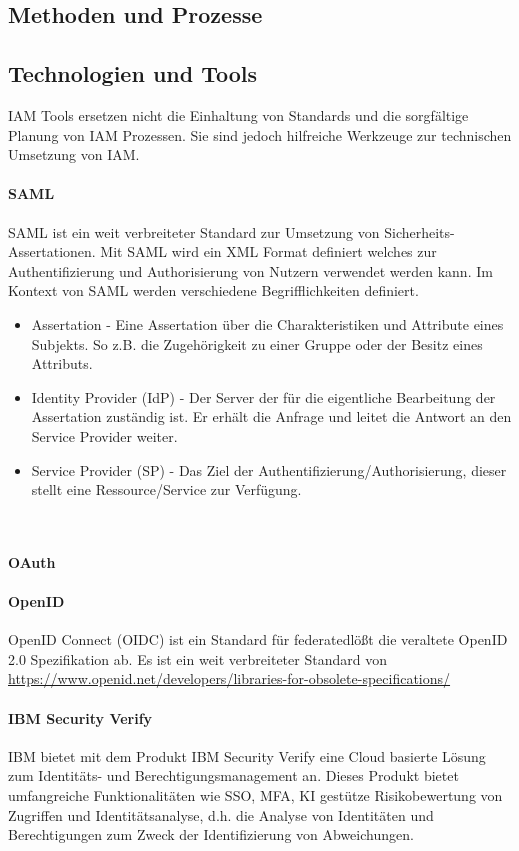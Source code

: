 \documentclass[10pt]{article}
\begin{document}
\subsection{Methoden und Prozesse}
\subsection{Technologien und Tools}
IAM Tools ersetzen nicht die Einhaltung von Standards und die sorgfältige Planung von IAM Prozessen. Sie sind jedoch hilfreiche Werkzeuge zur technischen Umsetzung von IAM.
\paragraph{SAML}
SAML ist ein weit verbreiteter Standard zur Umsetzung von Sicherheits-Assertationen. Mit SAML wird ein XML Format definiert welches zur Authentifizierung und Authorisierung von Nutzern verwendet werden kann. Im Kontext von SAML werden verschiedene Begrifflichkeiten definiert.
\begin{itemize}
  \item Assertation - Eine Assertation über die Charakteristiken und Attribute eines Subjekts. So z.B. die Zugehörigkeit zu einer Gruppe oder der Besitz eines Attributs.
  \item Identity Provider (IdP) - Der Server der für die eigentliche Bearbeitung der Assertation zuständig ist. Er erhält die Anfrage und leitet die Antwort an den Service Provider weiter.
  \item Service Provider (SP) - Das Ziel der Authentifizierung/Authorisierung, dieser stellt eine Ressource/Service zur Verfügung.
\end{itemize}
~\cite{hughes2005security}
\paragraph{OAuth}

\paragraph{OpenID}
OpenID Connect (OIDC) ist ein Standard für federatedlößt die veraltete OpenID 2.0 Spezifikation ab. Es ist ein weit verbreiteter Standard von
\url{https://www.openid.net/developers/libraries-for-obsolete-specifications/}

\paragraph{IBM Security Verify}
IBM bietet mit dem Produkt \glqq{}IBM Security Verify\grqq{} eine Cloud basierte Lösung zum Identitäts- und Berechtigungsmanagement an. Dieses Produkt bietet umfangreiche Funktionalitäten wie SSO, MFA, KI gestütze Risikobewertung von Zugriffen und Identitätsanalyse, d.h. die Analyse von Identitäten und Berechtigungen zum Zweck der Identifizierung von Abweichungen.
\end{document}
